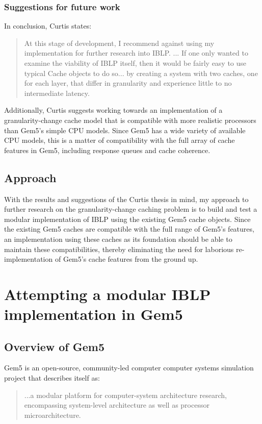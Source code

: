 \documentclass[12pt,twoside]{reedthesis}
\begin{document}
	\subsection*{Suggestions for future work}

	In conclusion, Curtis states: \begin{quote}
		At this stage of development, I recommend against using my implementation for further research into IBLP. ... If one only wanted to examine the viability of IBLP itself, then it would be fairly easy to use typical Cache objects to do so... by creating a system with two caches, one for each layer, that differ in granularity and experience little to no intermediate latency. \cite{curtis}
	\end{quote}

	Additionally, Curtis suggests working towards an implementation of a granularity-change cache model that is compatible with more realistic processors than Gem5's simple CPU models. Since Gem5 has a wide variety of available CPU models, this is a matter of compatibility with the full array of cache features in Gem5, including response queues and cache coherence.


\section{Approach}

With the results and suggestions of the Curtis thesis in mind, my approach to further research on the granularity-change caching problem is to build and test a modular implementation of IBLP using the existing Gem5 cache objects. Since the existing Gem5 caches are compatible with the full range of Gem5's features, an implementation using these caches as its foundation should be able to maintain these compatibilities, thereby eliminating the need for laborious re-implementation of Gem5's cache features from the ground up.


\chapter{Attempting a modular IBLP implementation in Gem5}

\section{Overview of Gem5}

Gem5 is an open-source, community-led computer computer systems simulation project that describes itself as: \begin{quote}
	...a modular platform for computer-system architecture research, encompassing system-level architecture as well as processor microarchitecture. \cite{gem5-about}
\end{quote}
\end{document}
